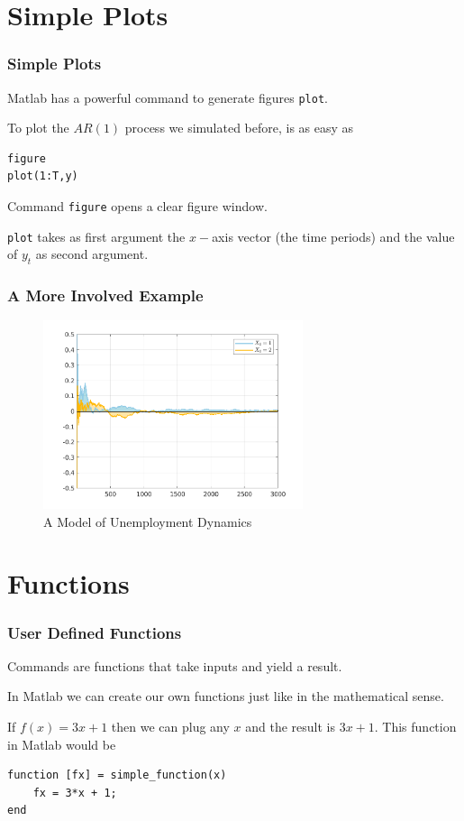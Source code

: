 \documentclass[11pt,xcolor={svgnames},aspectratio=169,usepdftitle=false]{beamer}
\let\toneitemize\itemize
\let\ttwoitemize\enditemize
\renewenvironment{itemize}{\toneitemize\addtolength{\itemsep}{1.35\baselineskip}}{\ttwoitemize}
\begin{document}
\section{Simple Plots}

\begin{frame}[fragile]
    \frametitle{Simple Plots}
    \begin{itemize}
        \item Matlab has a powerful command to generate figures \verb;plot;.
        \item To plot the $AR(1)$ process we simulated before, is as easy as
\begin{lstlisting}
figure
plot(1:T,y)
\end{lstlisting}
        \item Command \verb;figure; opens a clear figure window.
        \item \verb;plot; takes as first argument the $x-$axis vector (the time periods) and the value of $y_t$ as second argument.
    \end{itemize}
\end{frame}

\begin{frame}
    \frametitle{A More Involved Example}
\begin{figure}
    \centering
    \includegraphics[width = 0.68\textwidth]{../figures/unemployment_dynamics.png}
    \caption{A Model of Unemployment Dynamics}
    \label{fig:unemployment}
\end{figure}
\end{frame}

\section{Functions}

\begin{frame}[fragile]
    \frametitle{User Defined Functions}
\begin{itemize}
    \item Commands are functions that take inputs and yield a result.
    \item In Matlab we can create our own functions just like in the mathematical sense.
    \item If $f(x) = 3x + 1$ then we can plug any $x$ and the result is $3x + 1$. This function in Matlab would be
\end{itemize}
\begin{lstlisting}
function [fx] = simple_function(x)
    fx = 3*x + 1;
end
\end{lstlisting}
\end{frame}
\end{document}
